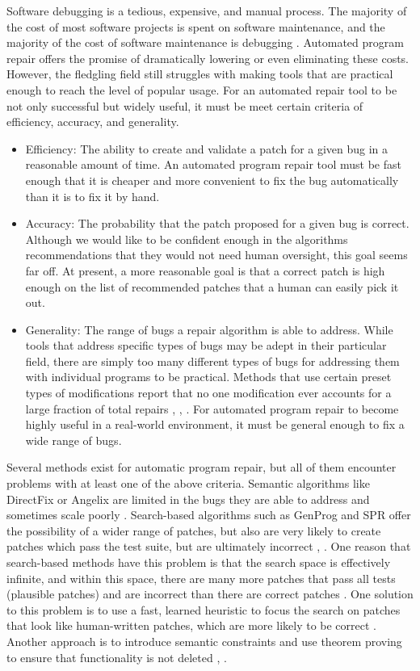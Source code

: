 \documentclass[conference]{IEEEtran}
\begin{document}
Software debugging is a tedious, expensive, and manual process. 
The majority of the cost of most software projects is spent on software maintenance, and the majority of the cost of software maintenance is debugging \cite{Genprog}. 
Automated program repair offers the promise of dramatically lowering or even eliminating these costs. 
However, the fledgling field still struggles with making tools that are practical enough to reach the level of popular usage. 
For an automated repair tool to be not only successful but widely useful, it must be meet certain criteria of efficiency, accuracy, and generality.
\begin{itemize}
\item Efficiency: 
	The ability to create and validate a patch for a given bug in a reasonable amount of time. An automated program repair tool must be fast enough that it is cheaper and more convenient to fix the bug automatically than it is to fix it by hand.
	
\item Accuracy: 
The probability that the patch proposed for a given bug is correct. 
Although we would like to be confident enough in the algorithms recommendations that they would not need human oversight, this goal seems far off. 
At present, a more reasonable goal is that a correct patch is high enough  on the list of recommended patches that a human can easily pick it out. 
\item Generality: 
The range of bugs a repair algorithm is able to address. 
While tools that address specific types of bugs may be adept in their particular field, there are simply too many different types of bugs for addressing them with individual programs to be practical. 
Methods that use certain preset types of modifications report that no one modification ever accounts for a large fraction of total repairs \cite{PAR}, \cite{hdrepair}, \cite{SPR}. 
For automated program repair to become highly useful in a real-world environment, it must be general enough to fix a wide range of bugs.
\end{itemize}


Several methods exist for automatic program repair, but all of them encounter problems with at least one of the above criteria. 
Semantic algorithms like DirectFix or Angelix are limited in the bugs they are able to address and sometimes scale poorly \cite{Angelix}. 
Search-based algorithms such as GenProg and SPR offer the possibility of a wider range of patches, but also are very likely to create patches which pass the test suite, but are ultimately incorrect \cite{Angelix}, \cite{SPR} \cite{Genprog}. One reason that search-based methods have this problem is that the search space is effectively infinite, and within this space, there are many more patches that pass all tests (plausible patches) and are incorrect than there are correct patches \cite{searchspace}. 
One solution to this problem is to use a fast, learned heuristic to focus the search on patches that look like human-written patches, which are more likely to be correct \cite{Prophet}. 
Another approach is to introduce semantic constraints and use theorem proving to ensure that functionality is not deleted \cite{SearchRepair}, \cite{srthesis}. 
\end{document}
